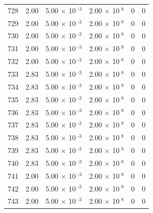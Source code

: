 \documentclass[a4paper,11pt]{article}
\begin{document}
\begin{center}
\begin{longtable}{|R{1.5cm}|R{2.4cm}|R{2.4cm}|R{2.4cm}|R{2.4cm}|R{2.4cm}|}
  728 &   2.00  &         5.00 $\times$ 10$^{\text{          -3}}$  &         2.00 $\times$ 10$^{\text{           8}}$  & 0  & 0 \\
  729 &   2.00  &         5.00 $\times$ 10$^{\text{          -3}}$  &         2.00 $\times$ 10$^{\text{           8}}$  & 0  & 0 \\
  730 &   2.00  &         5.00 $\times$ 10$^{\text{          -3}}$  &         2.00 $\times$ 10$^{\text{           8}}$  & 0  & 0 \\
  731 &   2.00  &         5.00 $\times$ 10$^{\text{          -3}}$  &         2.00 $\times$ 10$^{\text{           8}}$  & 0  & 0 \\
  732 &   2.00  &         5.00 $\times$ 10$^{\text{          -3}}$  &         2.00 $\times$ 10$^{\text{           8}}$  & 0  & 0 \\
  733 &   2.83  &         5.00 $\times$ 10$^{\text{          -3}}$  &         2.00 $\times$ 10$^{\text{           8}}$  & 0  & 0 \\
  734 &   2.83  &         5.00 $\times$ 10$^{\text{          -3}}$  &         2.00 $\times$ 10$^{\text{           8}}$  & 0  & 0 \\
  735 &   2.83  &         5.00 $\times$ 10$^{\text{          -3}}$  &         2.00 $\times$ 10$^{\text{           8}}$  & 0  & 0 \\
  736 &   2.83  &         5.00 $\times$ 10$^{\text{          -3}}$  &         2.00 $\times$ 10$^{\text{           8}}$  & 0  & 0 \\
  737 &   2.83  &         5.00 $\times$ 10$^{\text{          -3}}$  &         2.00 $\times$ 10$^{\text{           8}}$  & 0  & 0 \\
  738 &   2.83  &         5.00 $\times$ 10$^{\text{          -3}}$  &         2.00 $\times$ 10$^{\text{           8}}$  & 0  & 0 \\
  739 &   2.83  &         5.00 $\times$ 10$^{\text{          -3}}$  &         2.00 $\times$ 10$^{\text{           8}}$  & 0  & 0 \\
  740 &   2.83  &         5.00 $\times$ 10$^{\text{          -3}}$  &         2.00 $\times$ 10$^{\text{           8}}$  & 0  & 0 \\
  741 &   2.00  &         5.00 $\times$ 10$^{\text{          -3}}$  &         2.00 $\times$ 10$^{\text{           8}}$  & 0  & 0 \\
  742 &   2.00  &         5.00 $\times$ 10$^{\text{          -3}}$  &         2.00 $\times$ 10$^{\text{           8}}$  & 0  & 0 \\
  743 &   2.00  &         5.00 $\times$ 10$^{\text{          -3}}$  &         2.00 $\times$ 10$^{\text{           8}}$  & 0  & 0 \\

\end{longtable}
\end{center}
\end{document}
